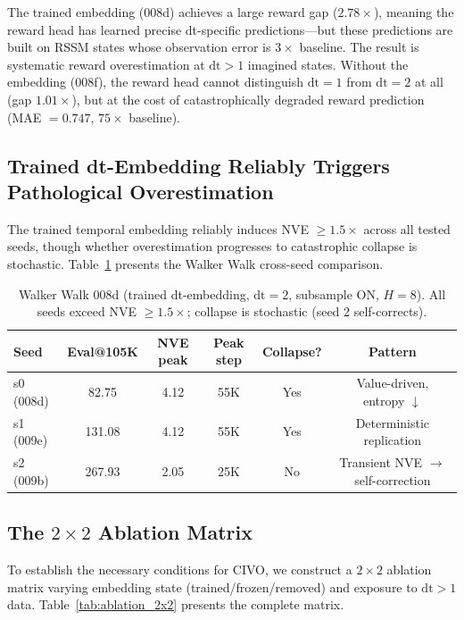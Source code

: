 \documentclass[10pt,letterpaper]{article}
\begin{document}
The trained embedding (008d) achieves a large reward gap ($2.78\times$), meaning the reward head has learned precise dt-specific predictions---but these predictions are built on RSSM states whose observation error is $3\times$ baseline.
The result is systematic reward overestimation at $\mathrm{dt}>1$ imagined states.
Without the embedding (008f), the reward head cannot distinguish $\mathrm{dt}=1$ from $\mathrm{dt}=2$ at all (gap $1.01\times$), but at the cost of catastrophically degraded reward prediction (MAE $= 0.747$, $75\times$ baseline).

\subsection{Trained dt-Embedding Reliably Triggers Pathological Overestimation}

The trained temporal embedding reliably induces NVE $\geq 1.5\times$ across all tested seeds, though whether overestimation progresses to catastrophic collapse is stochastic.
Table~\ref{tab:walker_008d} presents the Walker Walk cross-seed comparison.

\begin{table}[h]
\centering
\caption{Walker Walk 008d (trained dt-embedding, $\mathrm{dt}=2$, subsample ON, $H=8$). All seeds exceed NVE $\geq 1.5\times$; collapse is stochastic (seed 2 self-corrects).}
\label{tab:walker_008d}
\small
\begin{tabular}{lccccc}
\toprule
Seed & Eval@105K & NVE peak & Peak step & Collapse? & Pattern \\
\midrule
s0 (008d) & 82.75 & 4.12 & 55K & Yes & Value-driven, entropy $\downarrow$ \\
s1 (009e) & 131.08 & 4.12 & 55K & Yes & Deterministic replication \\
s2 (009b) & 267.93 & 2.05 & 25K & No & Transient NVE $\to$ self-correction \\
\bottomrule
\end{tabular}
\end{table}

\subsection{The $2\times 2$ Ablation Matrix}
\label{sec:ablation_matrix}

To establish the necessary conditions for CIVO, we construct a $2\times 2$ ablation matrix varying embedding state (trained/frozen/removed) and exposure to $\mathrm{dt}>1$ data.
Table~\ref{tab:ablation_2x2} presents the complete matrix.
\end{document}
